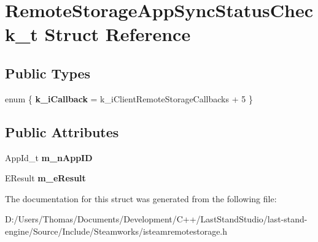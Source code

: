 \hypertarget{structRemoteStorageAppSyncStatusCheck__t}{}\section{Remote\+Storage\+App\+Sync\+Status\+Check\+\_\+t Struct Reference}
\label{structRemoteStorageAppSyncStatusCheck__t}
\subsection*{Public Types}
\begin{DoxyCompactItemize}
\item 
\hypertarget{structRemoteStorageAppSyncStatusCheck__t_aec3a186eadbac2f96b00999da47e1bb1}{}enum \{ {\bfseries k\+\_\+i\+Callback} = k\+\_\+i\+Client\+Remote\+Storage\+Callbacks + 5
 \}\label{structRemoteStorageAppSyncStatusCheck__t_aec3a186eadbac2f96b00999da47e1bb1}

\end{DoxyCompactItemize}
\subsection*{Public Attributes}
\begin{DoxyCompactItemize}
\item 
\hypertarget{structRemoteStorageAppSyncStatusCheck__t_a9a9b6195678c1154e712c8465571e29d}{}App\+Id\+\_\+t {\bfseries m\+\_\+n\+App\+I\+D}\label{structRemoteStorageAppSyncStatusCheck__t_a9a9b6195678c1154e712c8465571e29d}

\item 
\hypertarget{structRemoteStorageAppSyncStatusCheck__t_ae4519063ad68c8d5fd1b7493b06a7331}{}E\+Result {\bfseries m\+\_\+e\+Result}\label{structRemoteStorageAppSyncStatusCheck__t_ae4519063ad68c8d5fd1b7493b06a7331}

\end{DoxyCompactItemize}


The documentation for this struct was generated from the following file\+:\begin{DoxyCompactItemize}
\item 
D\+:/\+Users/\+Thomas/\+Documents/\+Development/\+C++/\+Last\+Stand\+Studio/last-\/stand-\/engine/\+Source/\+Include/\+Steamworks/isteamremotestorage.\+h\end{DoxyCompactItemize}
